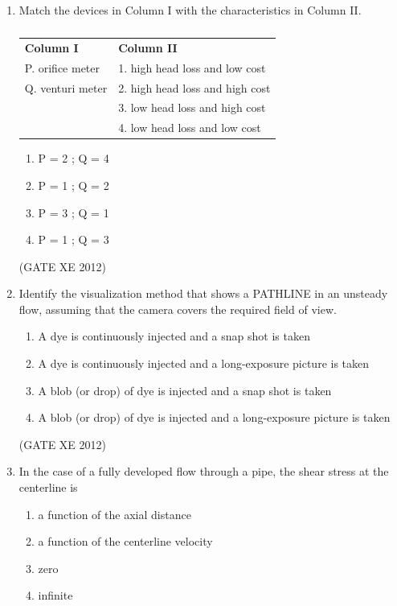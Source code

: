 \documentclass[12pt]{article}
\begin{document}
\begin{enumerate}
(GATE XE 2012)

\item Match the devices in Column I with the characteristics in Column II.

\begin{center}
\begin{table}[H]
\centering \caption{} \label{}
\begin{tabular}{l l}
\textbf{Column I} & \textbf{Column II} \\
P. orifice meter & 1. high head loss and low cost \\
Q. venturi meter & 2. high head loss and high cost \\
& 3. low head loss and high cost \\
& 4. low head loss and low cost \\
\end{tabular}
\end{table}
\end{center}

\begin{multicols}{4}
\begin{enumerate}
\item P = 2 ; Q = 4
\item P = 1 ; Q = 2
\item P = 3 ; Q = 1
\item P = 1 ; Q = 3
\end{enumerate}
\end{multicols}

(GATE XE 2012)

\item Identify the visualization method that shows a PATHLINE in an unsteady flow, assuming that the camera covers the required field of view.
\begin{enumerate}
\item A dye is continuously injected and a snap shot is taken
\item A dye is continuously injected and a long-exposure picture is taken
\item A blob (or drop) of dye is injected and a snap shot is taken
\item A blob (or drop) of dye is injected and a long-exposure picture is taken
\end{enumerate}

(GATE XE 2012)

\item In the case of a fully developed flow through a pipe, the shear stress at the centerline is
\begin{multicols}{2}
\begin{enumerate}
\item a function of the axial distance
\item a function of the centerline velocity
\item zero
\item infinite
\end{enumerate}
\end{multicols}


\end{enumerate}
\end{document}
